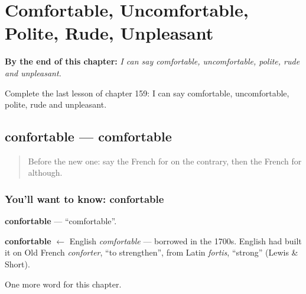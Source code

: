 
\chapter{Comfortable, Uncomfortable, Polite, Rude, Unpleasant}
\label{ch:fr-comfortable-uncomfortable-polite-rude-unpleasant}

\begin{chapteropening}
\textbf{By the end of this chapter:} \emph{I can say comfortable, uncomfortable, polite, rude and unpleasant.}

Complete the last lesson of chapter 159: I can say comfortable, uncomfortable, polite, rude and unpleasant.
\end{chapteropening}

\section[confortable]{confortable — comfortable}

\label{lesson:FR-C159-confortable}



\begin{quote}
Before the new one: say the French for on the contrary, then the French for although.
\end{quote}

\subsection*{You'll want to know: confortable}
\textbf{confortable} — \textquotedblleft{}comfortable\textquotedblright{}.

\begin{cousinweb}
\textbf{confortable} $\leftarrow$ English \emph{comfortable} — borrowed in the 1700s. English had built it on Old French \emph{conforter}, \textquotedblleft{}to strengthen\textquotedblright{}, from Latin \emph{fortis}, \textquotedblleft{}strong\textquotedblright{} (Lewis \& Short).
\end{cousinweb}

\begin{grammarlens}[title={What you've built}]
One more word for this chapter.
\end{grammarlens}

